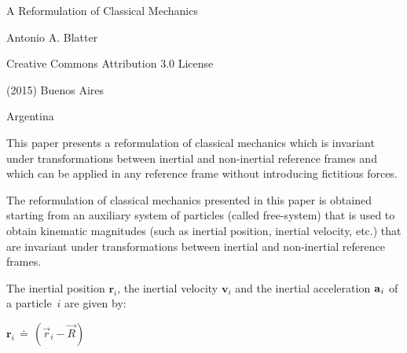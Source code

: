 \documentclass[10pt]{article}
\begin{document}
\begin{center}

{\LARGE A Reformulation of Classical Mechanics}

\bigskip \medskip

{\large Antonio A. Blatter}

\bigskip \medskip

\small

Creative Commons Attribution 3.0 License

\smallskip

(2015) Buenos Aires

\smallskip

Argentina

\smallskip

\bigskip \medskip

\parbox{99.00mm}{This paper presents a reformulation of classical mechanics which is invariant under transformations between inertial and non-inertial \hbox {reference} frames and which can be applied in any reference frame \hbox {without} introducing fictitious forces.}

\end{center}

\normalsize

\vspace{-1.20em}

\par {}

\par \bigskip \noindent The reformulation of classical mechanics presented in this paper is obtained starting from an auxiliary system of particles (called free-system) that is used to obtain kinematic magnitudes (such as inertial position, inertial velocity, etc.) that are invariant under transformations between inertial and non-inertial reference frames.

\par \bigskip \noindent The inertial position ${\mathbf{r}}_i$, the inertial velocity ${\mathbf{v}}_i$ and the inertial acceleration ${\mathbf{a}}_{\hspace{+0.045em}i}$ of a \hbox {particle $i$} are given by:

\par \bigskip\smallskip ${\mathbf{r}}_i \,\doteq\, ({\vec{\mathit{r}}}_i - {\vec{\mathit{R}}})$
\end{document}

